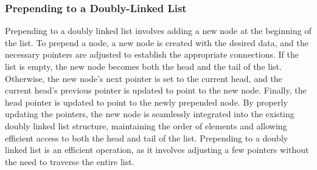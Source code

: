\subsubsection{Prepending to a Doubly-Linked List}

Prepending to a doubly linked list involves adding a new node at the beginning of the list. To prepend a node, a new node is created with the desired data, and the necessary pointers are adjusted to establish the appropriate connections. If the list is empty, the new node becomes both the head and the 
tail of the list. Otherwise, the new node's next pointer is set to the current head, and the current head's previous pointer is updated to point to the new node. Finally, the head pointer is updated to point to the newly prepended node. By properly updating the pointers, the new node is seamlessly integrated 
into the existing doubly linked list structure, maintaining the order of elements and allowing efficient access to both the head and tail of the list. Prepending to a doubly linked list is an efficient operation, as it involves adjusting a few pointers without the need to traverse the entire list.


